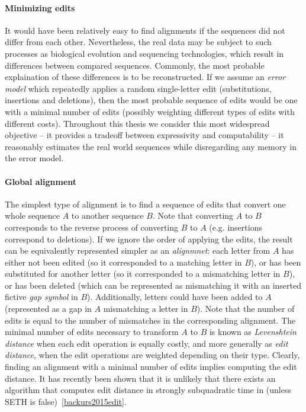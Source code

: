 
\paragraph{Minimizing edits}
It would have been relatively easy to find alignments if the sequences did not
differ from each other. Nevertheless, the real data may be subject to such
processes as biological evolution and sequencing technologies, which result in
differences between compared sequences. Commonly, the most probable explaination
of these differences is to be reconstructed. If we assume an \emph{error model}
which repeatedly applies a random single-letter edit (substitutions, insertions
and deletions), then the most probable sequence of edits would be one with a
minimal number of edits (possibly weighting different types of edits with
different costs). Throughout this thesis we consider this most widespread
objective -- it provides a tradeoff between expressivity and computability -- it
reasonably estimates the real world sequences while disregarding any memory in
the error model.

\paragraph{Global alignment}
The simplest type of alignment is to find a sequence of edits that convert one
whole sequence $A$ to another sequence $B$. Note that converting $A$ to $B$
corresponds to the reverse process of converting $B$ to $A$ (e.g. insertions
correspond to deletions). If we ignore the order of applying the edits, the
result can be equivalently represented simpler as an \emph{alignmnet}: each
letter from $A$ has either not been edited (so it corresponded to a matching
letter in $B$), or has been substituted for another letter (so it corresponded
to a mismatching letter in $B$), or has been deleted (which can be represented
as mismatching it with an inserted fictive \emph{gap symbol} in $B$).
Additionally, letters could have been added to $A$ (represented as a gap in $A$
mismatching a letter in $B$). Note that the number of edits is equal to the
number of mismatches in the corresponding alignment. The minimal number of edits
necessary to transform $A$ to $B$ is known as \emph{Levenshtein distance} when
each edit operation is equally costly, and more generally as \emph{edit
distance}, when the edit operations are weighted depending on their type.
Clearly, finding an alignment with a minimal number of edits implies computing
the edit distance. It has recently been shown that it is unlikely that there
exists an algorithm that computes edit distance in strongly subquadratic time in
(unless SETH is false)~\cref{backurs2015edit}.

